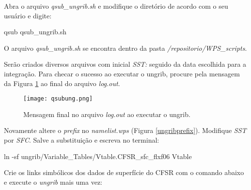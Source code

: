 \noindent Abra o arquivo \textit{qsub\_ungrib.sh} e modifique o diretório de acordo com o seu usuário e  digite:
\bigskip

\begin{bashcode}
qsub qsub_ungrib.sh
\end{bashcode}
\bigskip

\begin{tcolorbox}[enhanced,
  grow to left by=0cm,%
  grow to right by=0cm,%
  enlarge top by=0cm,%
  enlarge bottom by=0cm,%
  tcbox raise base,
  boxrule=1.0pt,
  left=18mm,
  colframe=red!50!black,coltext=red!25!black,colback=red!10!white,
  overlay={\begin{tcbclipinterior}\fill[red!75!blue!50!white] (frame.south west)
    rectangle node[text=white,font=\sffamily\bfseries\footnotesize,rotate=0] {ATENÇÃO} ([xshift=18mm]frame.north west);\end{tcbclipinterior}}]
O arquivo \textit{qsub\_ungrib.sh} se encontra dentro da pasta \textit{/repositorio/WPS\_scripts}.
\end{tcolorbox}
\bigskip

\noindent Serão criados diversos arquivos com inicial \textit{SST:} seguido da data escolhida para a integração. Para checar o sucesso ao executar o ungrib, procure pela mensagem da Figura \textcolor{bleu_cite}{\ref{ungribsucess}} ao final do arquivo \textit{log.out}.
\bigskip

\begin{figure}[H]
    \centering
    \texttt{[image: qsubung.png]}
    \caption{Mensagem final no arquivo \textit{log.out} ao executar o ungrib.}
    \label{ungribsucess}
\end{figure}
\bigskip

\noindent Novamente altere o \textit{prefix} no \textit{namelist.wps} (Figura \textcolor{bleu_cite}{\ref{ungribprefix}}). Modifique \textit{SST} por \textit{SFC}. Salve a substituição e escreva no terminal:
\bigskip

\begin{bashcode}
ln -sf ungrib/Variable_Tables/Vtable.CFSR_sfc_flxf06 Vtable
\end{bashcode}
\bigskip

\noindent Crie os links simbólicos dos dados de superfície do CFSR com o comando abaixo e execute o \textit{ungrib} mais uma vez:
\bigskip

